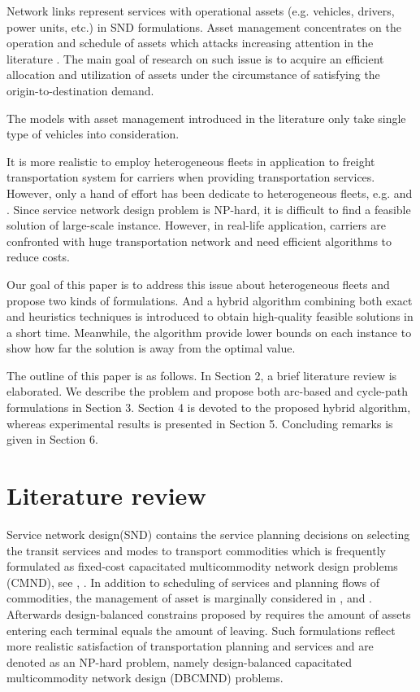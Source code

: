 \documentclass[11pt,nonblindrev,fleqn]{article}
\begin{document}
Network links represent services with operational assets (e.g. vehicles, drivers, power units, etc.) in SND formulations. Asset management concentrates on the operation and schedule of assets which attacks increasing attention in the literature \citep{Andersen2009bService,Andersen2011Branch}. The main goal of research on such issue is to acquire an efficient allocation and utilization of assets under the circumstance of satisfying the origin-to-destination demand.

The models with asset management introduced in the literature only take single type of vehicles into consideration.

It is more realistic to employ heterogeneous fleets in application to freight transportation system for carriers when providing transportation services. However, only a hand of effort has been dedicate to heterogeneous fleets, e.g. \cite{Kim1999Multimodal} and \cite{Li2016Design}. Since service network design problem is NP-hard, it is difficult to find a feasible solution of large-scale instance. However, in real-life application, carriers are confronted with huge transportation network and need efficient algorithms to reduce costs.

Our goal of this paper is to address this issue about heterogeneous fleets and propose two kinds of formulations. And a hybrid algorithm combining both exact and heuristics techniques is introduced to obtain high-quality feasible solutions in a short time. Meanwhile, the algorithm provide lower bounds on each instance to show how far the solution is away from the optimal value.

The outline of this paper is as follows. In Section 2, a brief literature review is elaborated. We describe the problem and propose both arc-based and cycle-path formulations in Section 3. Section 4 is devoted to the proposed hybrid algorithm, whereas experimental results is presented in Section 5. Concluding remarks is given in Section 6.

\section{Literature review}
Service network design(SND) contains the service planning decisions on selecting the transit services and modes to transport commodities which is frequently formulated as fixed-cost capacitated multicommodity network design problems (CMND), see \cite{Magnanti1984Network}, \cite{Minoux1989Networks}. In addition to scheduling of services and planning flows of commodities, the management of asset is marginally considered in \cite{Crainic2000Service}, \cite{Smilowitz2002Deferred} and \cite{crainic2003long}. Afterwards design-balanced constrains proposed by \cite{Pedersen2009Models} requires the amount of assets entering each terminal equals the amount of leaving. Such formulations reflect more realistic satisfaction of transportation planning and services and are denoted as an NP-hard problem, namely design-balanced capacitated multicommodity network design (DBCMND) problems.
\end{document}
